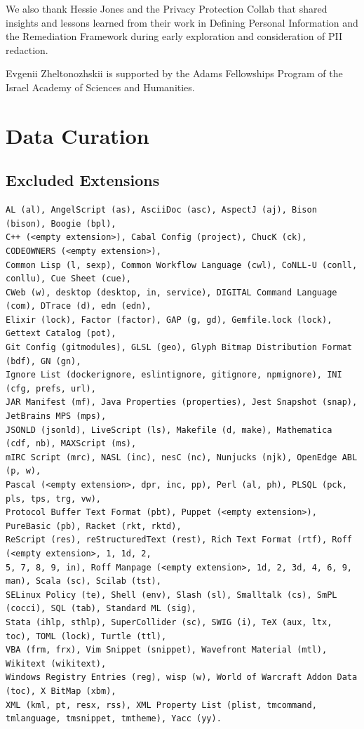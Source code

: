 \documentclass[10pt]{article} %
\begin{document}
We also thank Hessie Jones and the Privacy Protection Collab that shared insights and lessons learned from their work in Defining Personal Information and the Remediation Framework during early exploration and consideration of PII redaction.

Evgenii Zheltonozhskii is supported by the Adams Fellowships Program of the Israel Academy of Sciences and Humanities.

\clearpage




\clearpage

\appendix

\section{Data Curation}

\subsection{Excluded Extensions}\label{sec:excluded_extensions}
\begin{Verbatim}
AL (al), AngelScript (as), AsciiDoc (asc), AspectJ (aj), Bison (bison), Boogie (bpl), 
C++ (<empty extension>), Cabal Config (project), ChucK (ck), CODEOWNERS (<empty extension>), 
Common Lisp (l, sexp), Common Workflow Language (cwl), CoNLL-U (conll, conllu), Cue Sheet (cue), 
CWeb (w), desktop (desktop, in, service), DIGITAL Command Language (com), DTrace (d), edn (edn),
Elixir (lock), Factor (factor), GAP (g, gd), Gemfile.lock (lock), Gettext Catalog (pot), 
Git Config (gitmodules), GLSL (geo), Glyph Bitmap Distribution Format (bdf), GN (gn), 
Ignore List (dockerignore, eslintignore, gitignore, npmignore), INI (cfg, prefs, url), 
JAR Manifest (mf), Java Properties (properties), Jest Snapshot (snap), JetBrains MPS (mps), 
JSONLD (jsonld), LiveScript (ls), Makefile (d, make), Mathematica (cdf, nb), MAXScript (ms), 
mIRC Script (mrc), NASL (inc), nesC (nc), Nunjucks (njk), OpenEdge ABL (p, w), 
Pascal (<empty extension>, dpr, inc, pp), Perl (al, ph), PLSQL (pck, pls, tps, trg, vw), 
Protocol Buffer Text Format (pbt), Puppet (<empty extension>), PureBasic (pb), Racket (rkt, rktd), 
ReScript (res), reStructuredText (rest), Rich Text Format (rtf), Roff (<empty extension>, 1, 1d, 2, 
5, 7, 8, 9, in), Roff Manpage (<empty extension>, 1d, 2, 3d, 4, 6, 9, man), Scala (sc), Scilab (tst), 
SELinux Policy (te), Shell (env), Slash (sl), Smalltalk (cs), SmPL (cocci), SQL (tab), Standard ML (sig),
Stata (ihlp, sthlp), SuperCollider (sc), SWIG (i), TeX (aux, ltx, toc), TOML (lock), Turtle (ttl), 
VBA (frm, frx), Vim Snippet (snippet), Wavefront Material (mtl), Wikitext (wikitext), 
Windows Registry Entries (reg), wisp (w), World of Warcraft Addon Data (toc), X BitMap (xbm), 
XML (kml, pt, resx, rss), XML Property List (plist, tmcommand, tmlanguage, tmsnippet, tmtheme), Yacc (yy).
\end{Verbatim}
\end{document}
